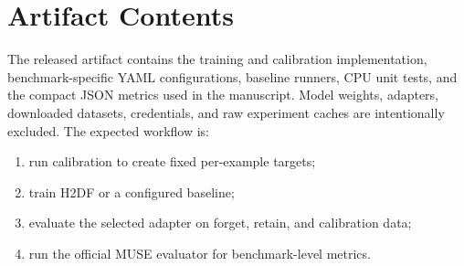 \documentclass[10pt,twocolumn]{article}
\newcommand{\method}{\textsc{H2DF}}
\begin{document}
\section{Artifact Contents}
\label{app:artifacts}

The released artifact contains the training and calibration implementation,
benchmark-specific YAML configurations, baseline runners, CPU unit tests, and
the compact JSON metrics used in the manuscript. Model weights, adapters,
downloaded datasets, credentials, and raw experiment caches are intentionally
excluded. The expected workflow is:
\begin{enumerate}[label=\arabic*.,leftmargin=1.8em]
  \item run calibration to create fixed per-example targets;
  \item train \method{} or a configured baseline;
  \item evaluate the selected adapter on forget, retain, and calibration data;
  \item run the official MUSE evaluator for benchmark-level metrics.
\end{enumerate}
\end{document}
